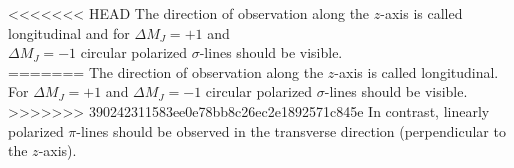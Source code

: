 <<<<<<< HEAD
The direction of observation along the $z$-axis is called longitudinal and for $\Delta M_J = + 1$ and\\$\Delta M_J = - 1$ circular polarized $\sigma$-lines should be visible.\\
=======
The direction of observation along the $z$-axis is called longitudinal. For $\Delta M_J = + 1$ and $\Delta M_J = - 1$ circular polarized $\sigma$-lines should be visible.\\
>>>>>>> 390242311583ee0e78bb8c26ec2e1892571c845e
In contrast, linearly polarized $\pi$-lines should be observed in the transverse direction (perpendicular to the $z$-axis).